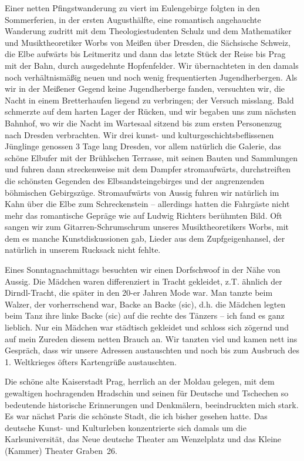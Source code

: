 Einer netten Pfingstwanderung zu viert im Eulengebirge folgten in den Sommerferien, in der ersten Augusthälfte, eine romantisch angehauchte Wanderung zudritt mit dem Theologiestudenten Schulz und dem Mathematiker und Musiktheoretiker Worbs von Meißen über Dresden, die Sächsische Schweiz, die Elbe aufwärts bis Leitmeritz und dann das letzte Stück der Reise bis Prag mit der Bahn, durch ausgedehnte Hopfenfelder. Wir übernachteten in den damals noch verhältnismäßig neuen und noch wenig frequentierten Jugendherbergen. Als wir in der Meißener Gegend keine Jugendherberge fanden, versuchten wir, die Nacht in einem Bretterhaufen liegend zu verbringen; der Versuch misslang. Bald schmerzte auf dem harten Lager der Rücken, und wir begaben uns zum nächsten Bahnhof, wo wir die Nacht im Wartesaal sitzend bis zum ersten Personenzug nach Dresden verbrachten. Wir drei kunst- und kulturgeschichtsbeflissenen Jünglinge genossen 3 Tage lang Dresden, vor allem natürlich die Galerie, das schöne Elbufer mit der Brühlschen Terrasse, mit seinen Bauten und Sammlungen und fuhren dann streckenweise mit dem Dampfer stromaufwärts, durchstreiften die schönsten Gegenden des Elbsandsteingebirges und der angrenzenden böhmischen Gebirgszüge. Stromaufwärts von Aussig fuhren wir natürlich im Kahn über die Elbe zum Schreckenstein -- allerdings hatten die Fahrgäste nicht mehr das romantische Gepräge wie auf Ludwig Richters berühmten Bild. Oft sangen wir zum Gitarren-Schrumschrum unseres Musiktheoretikers Worbs, mit dem es manche Kunstdiskussionen gab, Lieder aus dem Zupfgeigenhansel, der natürlich in unserem Rucksack nicht fehlte.

Eines Sonntagnachmittags besuchten wir einen Dorfschwoof in der Nähe von Aussig. Die Mädchen waren differenziert in Tracht gekleidet, z.T. ähnlich der Dirndl-Tracht, die später in den 20-er Jahren Mode war. Man tanzte beim Walzer, der vorherrschend war, Backe an Backe (sic), d.h. die Mädchen legten beim Tanz ihre linke Backe (sic) auf die rechte des Tänzers -- ich fand es ganz lieblich. Nur ein Mädchen war städtisch gekleidet und schloss sich zögernd und auf mein Zureden diesem netten Brauch an. Wir tanzten viel und kamen nett ins Gespräch, dass wir unsere Adressen austauschten und noch bis zum Ausbruch des 1. Weltkrieges öfters Kartengrüße austauschten.

Die schöne alte Kaiserstadt Prag, herrlich an der Moldau gelegen, mit dem gewaltigen hochragenden Hradschin und seinen für Deutsche und Tschechen so bedeutende historische Erinnerungen und Denkmälern, beeindruckten mich stark. Es war nächst Paris die schönste Stadt, die ich bisher gesehen hatte. Das deutsche Kunst- und Kulturleben konzentrierte sich damals um die Karlsuniversität, das Neue deutsche Theater am Wenzelplatz und das Kleine (Kammer) Theater Graben~26.

